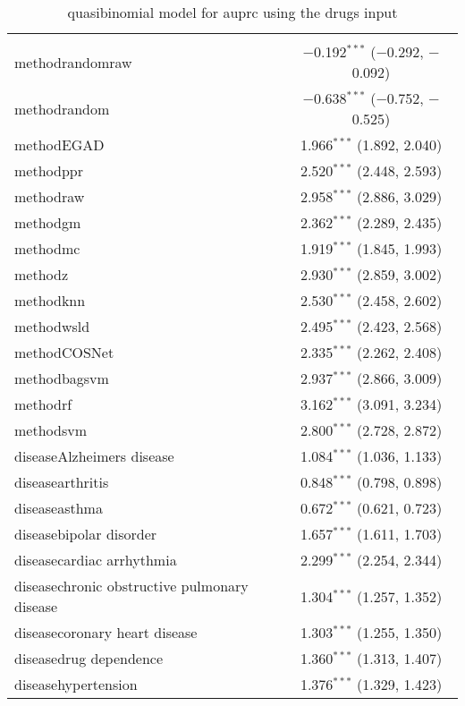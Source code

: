 
\begin{table}[!htbp] \centering 
  \caption{quasibinomial model for auprc using the drugs input} 
  \label{} 
\begin{tabular}{@{\extracolsep{5pt}}lc} 
\\[-1.8ex]\hline 
\hline \\[-1.8ex] 
 methodrandomraw & $-$0.192$^{***}$ ($-$0.292, $-$0.092) \\ 
  methodrandom & $-$0.638$^{***}$ ($-$0.752, $-$0.525) \\ 
  methodEGAD & 1.966$^{***}$ (1.892, 2.040) \\ 
  methodppr & 2.520$^{***}$ (2.448, 2.593) \\ 
  methodraw & 2.958$^{***}$ (2.886, 3.029) \\ 
  methodgm & 2.362$^{***}$ (2.289, 2.435) \\ 
  methodmc & 1.919$^{***}$ (1.845, 1.993) \\ 
  methodz & 2.930$^{***}$ (2.859, 3.002) \\ 
  methodknn & 2.530$^{***}$ (2.458, 2.602) \\ 
  methodwsld & 2.495$^{***}$ (2.423, 2.568) \\ 
  methodCOSNet & 2.335$^{***}$ (2.262, 2.408) \\ 
  methodbagsvm & 2.937$^{***}$ (2.866, 3.009) \\ 
  methodrf & 3.162$^{***}$ (3.091, 3.234) \\ 
  methodsvm & 2.800$^{***}$ (2.728, 2.872) \\ 
  diseaseAlzheimers disease & 1.084$^{***}$ (1.036, 1.133) \\ 
  diseasearthritis & 0.848$^{***}$ (0.798, 0.898) \\ 
  diseaseasthma & 0.672$^{***}$ (0.621, 0.723) \\ 
  diseasebipolar disorder & 1.657$^{***}$ (1.611, 1.703) \\ 
  diseasecardiac arrhythmia & 2.299$^{***}$ (2.254, 2.344) \\ 
  diseasechronic obstructive pulmonary disease & 1.304$^{***}$ (1.257, 1.352) \\ 
  diseasecoronary heart disease & 1.303$^{***}$ (1.255, 1.350) \\ 
  diseasedrug dependence & 1.360$^{***}$ (1.313, 1.407) \\ 
  diseasehypertension & 1.376$^{***}$ (1.329, 1.423) \\ 

\end{tabular}
\end{table}
